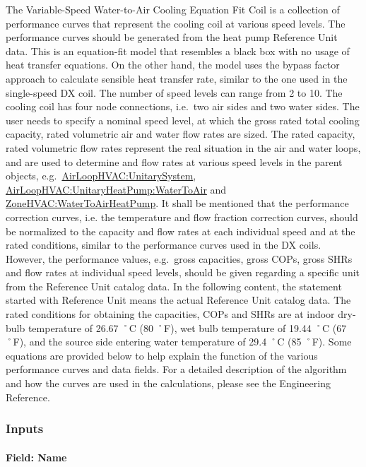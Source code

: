 The Variable-Speed Water-to-Air Cooling Equation Fit Coil is a collection of performance curves that represent the cooling coil at various speed levels. The performance curves should be generated from the heat pump Reference Unit data. This is an equation-fit model that resembles a black box with no usage of heat transfer equations. On the other hand, the model uses the bypass factor approach to calculate sensible heat transfer rate, similar to the one used in the single-speed DX coil. The number of speed levels can range from 2 to 10. The cooling coil has four node connections, i.e.~two air sides and two water sides. The user needs to specify a nominal speed level, at which the gross rated total cooling capacity, rated volumetric air and water flow rates are sized. The rated capacity, rated volumetric flow rates represent the real situation in the air and water loops, and are used to determine and flow rates at various speed levels in the parent objects, e.g.~\hyperref[airloophvacunitarysystem]{AirLoopHVAC:UnitarySystem}, \hyperref[airloophvacunitaryheatpumpwatertoair]{AirLoopHVAC:UnitaryHeatPump:WaterToAir} and \hyperref[zonehvacwatertoairheatpump]{ZoneHVAC:WaterToAirHeatPump}. It shall be mentioned that the performance correction curves, i.e. the temperature and flow fraction correction curves, should be normalized to the capacity and flow rates at each individual speed and at the rated conditions, similar to the performance curves used in the DX coils. However, the performance values, e.g.~gross capacities, gross COPs, gross SHRs and flow rates at individual speed levels, should be given regarding a specific unit from the Reference Unit catalog data. In the following content, the statement started with Reference Unit means the actual Reference Unit catalog data. The rated conditions for obtaining the capacities, COPs and SHRs are at indoor dry-bulb temperature of 26.67 ˚C (80 ˚F), wet bulb temperature of 19.44 ˚C (67 ˚F), and the source side entering water temperature of 29.4 ˚C (85 ˚F). Some equations are provided below to help explain the function of the various performance curves and data fields. For a detailed description of the algorithm and how the curves are used in the calculations, please see the Engineering Reference.

\subsubsection{Inputs}\label{inputs-31}

\paragraph{Field: Name}\label{field-name-30}

